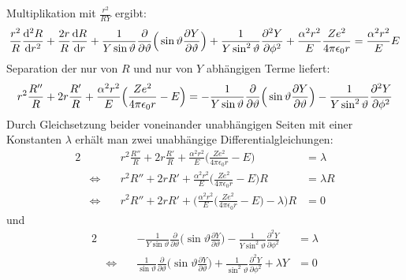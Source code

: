 \documentclass[9pt]{report}
\begin{document}
Multiplikation mit $\frac{r^2}{RY}$ ergibt:
\begin{equation}
\frac{r^2}{R}\frac{\mathrm{d}^{2}R}{\mathrm{d} r^2}+\frac{2r}{R}\frac{\mathrm{d}R}{\mathrm{d} r}+\frac{1}{Y\sin\vartheta}\frac{\partial}{\partial\vartheta}\Big(\sin\vartheta\frac{\partial Y}{\partial\vartheta}\Big)+\frac{1}{Y\sin^{2}\vartheta}\frac{\partial^{2}Y}{\partial\phi^2}+\frac{\alpha^{2}r^{2}}{E}\frac{Ze^{2}}{4\pi\epsilon_{0}r}=\frac{\alpha^{2}r^{2}}{E}E\notag
\end{equation}
Separation der nur von $R$ und nur von $Y$ abhängigen Terme liefert:
\begin{equation}
r^{2}\frac{R''}{R}+2r\frac{R'}{R}+\frac{\alpha^{2}r^{2}}{E}\Big(\frac{Ze^{2}}{4\pi\epsilon_{0}r}-E\Big)=-\frac{1}{Y\sin\vartheta}\frac{\partial}{\partial\vartheta}\Big(\sin\vartheta\frac{\partial Y}{\partial\vartheta}\Big)-\frac{1}{Y\sin^{2}\vartheta}\frac{\partial^{2}Y}{\partial\phi^2}\notag
\end{equation}
Durch Gleichsetzung beider voneinander unabhängigen Seiten mit einer Konstanten $\lambda$ erhält man zwei unabhängige Differentialgleichungen:
\begin{alignat*}{2}
&\qquad & r^{2}\frac{R''}{R}+2r\frac{R'}{R}+\frac{\alpha^{2}r^{2}}{E}\Big(\frac{Ze^{2}}{4\pi\epsilon_{0}r}-E\Big)&=\lambda\\
&\Leftrightarrow & r^{2}R''+2rR'+\frac{\alpha^{2}r^{2}}{E}\Big(\frac{Ze^{2}}{4\pi\epsilon_{0}r}-E\Big)R &=\lambda R\\
&\Leftrightarrow & r^{2}R''+2rR'+\bigg(\frac{\alpha^{2}r^{2}}{E}\Big(\frac{Ze^{2}}{4\pi\epsilon_{0}r}-E\Big)-\lambda\bigg) R &=0
\end{alignat*}
und
\begin{alignat*}{2}
&\qquad & -\frac{1}{Y\sin\vartheta}\frac{\partial}{\partial\vartheta}\Big(\sin\vartheta\frac{\partial Y}{\partial\vartheta}\Big)-\frac{1}{Y\sin^{2}\vartheta}\frac{\partial^{2}Y}{\partial\phi^2}&=\lambda\\
&\Leftrightarrow & \frac{1}{\sin\vartheta}\frac{\partial}{\partial\vartheta}\Big(\sin\vartheta\frac{\partial Y}{\partial\vartheta}\Big)+\frac{1}{\sin^{2}\vartheta}\frac{\partial^{2}Y}{\partial\phi^2}+\lambda Y &=0
\end{alignat*}
\end{document}
